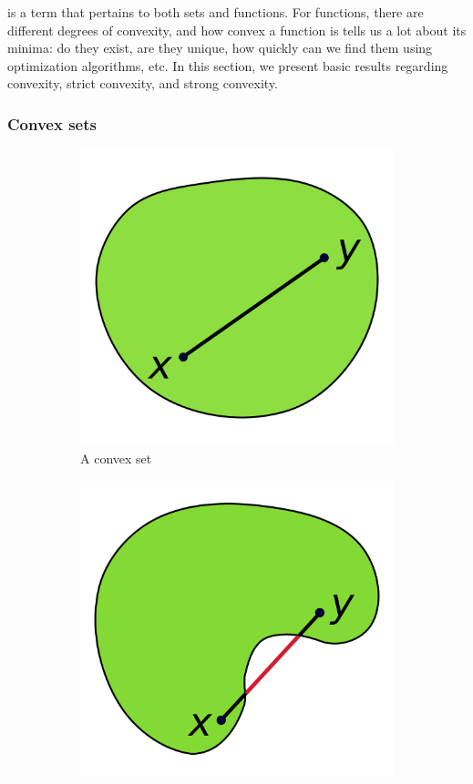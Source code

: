  is a term that pertains to both sets and functions.
For functions, there are different degrees of convexity, and how convex a function is tells us a lot about its minima: do they exist, are they unique, how quickly can we find them using optimization algorithms, etc.
In this section, we present basic results regarding convexity, strict convexity, and strong convexity.

\subsubsection{Convex sets}
\begin{figure}
  \centering
  \begin{subfigure}[b]{0.45\linewidth}
    \includegraphics[width=\linewidth]{convex-set}
    \caption{A convex set}
  \end{subfigure}
  \begin{subfigure}[b]{0.45\linewidth}
    \includegraphics[width=\linewidth]{nonconvex-set}

\end{subfigure}
\end{figure}
